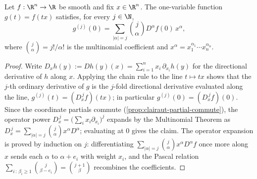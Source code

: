 \begin{proposition}
\label{prop:directional-derivative-multinomial}
\leanok
Let $f : \R^n \to \R$ be smooth and fix $x \in \R^n$. The one-variable function
$g(t) = f(tx)$ satisfies, for every $j \in \N$,
$$g^{(j)}(0) = \sum_{|\alpha|=j} \binom{j}{\alpha} D^\alpha f(0)\, x^\alpha,$$
where $\binom{j}{\alpha} = j!/\alpha!$ is the multinomial coefficient and
$x^\alpha = x_1^{\alpha_1}\cdots x_n^{\alpha_n}$.
\end{proposition}
\begin{proof}
\leanok
Write $D_x h(y) := Dh(y)(x) = \sum_{i=1}^n x_i\,\partial_{x_i} h(y)$ for the
directional derivative of $h$ along $x$. Applying the chain rule to the line
$t \mapsto tx$ shows that the $j$-th ordinary derivative of $g$ is the $j$-fold
directional derivative evaluated along the line, $g^{(j)}(t) = (D_x^{\,j} f)(tx)$;
in particular $g^{(j)}(0) = (D_x^{\,j}f)(0)$. Since the coordinate partials commute
(\cref{prop:clairaut-partial-commute}), the operator power
$D_x^{\,j} = \bigl(\sum_i x_i\partial_{x_i}\bigr)^j$ expands by the Multinomial
Theorem as $D_x^{\,j} = \sum_{|\alpha|=j}\binom{j}{\alpha} x^\alpha D^\alpha$;
evaluating at $0$ gives the claim. The operator expansion is proved by induction
on $j$: differentiating $\sum_{|\alpha|=j}\binom{j}{\alpha}x^\alpha D^\alpha f$ once
more along $x$ sends each $\alpha$ to $\alpha + e_i$ with weight $x_i$, and the
Pascal relation $\sum_{i\,:\,\beta_i\geq 1}\binom{j}{\beta-e_i} = \binom{j+1}{\beta}$
recombines the coefficients.
\end{proof}

